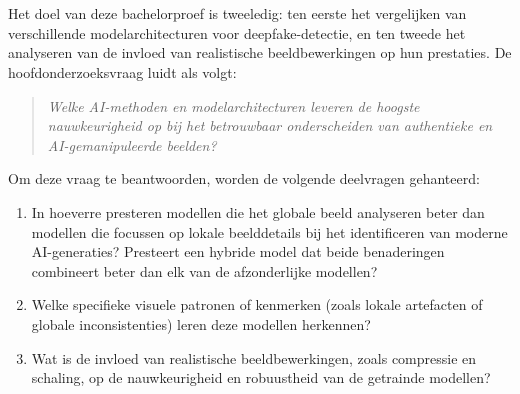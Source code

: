 \section{}%
\label{sec:onderzoeksvraag}

Het doel van deze bachelorproef is tweeledig: ten eerste het vergelijken van verschillende modelarchitecturen voor deepfake-detectie, en ten tweede het analyseren van de invloed van realistische beeldbewerkingen op hun prestaties. De hoofdonderzoeksvraag luidt als volgt:

\begin{quote}
    \textit{Welke AI-methoden en modelarchitecturen leveren de hoogste nauwkeurigheid op bij het betrouwbaar onderscheiden van authentieke en AI-gemanipuleerde beelden?}
\end{quote}

Om deze vraag te beantwoorden, worden de volgende deelvragen gehanteerd:
\begin{enumerate}
    \item In hoeverre presteren modellen die het globale beeld analyseren beter dan modellen die focussen op lokale beelddetails bij het identificeren van moderne AI-generaties? Presteert een hybride model dat beide benaderingen combineert beter dan elk van de afzonderlijke modellen?
    \item Welke specifieke visuele patronen of kenmerken (zoals lokale artefacten of globale inconsistenties) leren deze modellen herkennen?
    \item Wat is de invloed van realistische beeldbewerkingen, zoals compressie en schaling, op de nauwkeurigheid en robuustheid van de getrainde modellen?
\end{enumerate}

\section{}%
\label{sec:onderzoeksdoelstelling}

